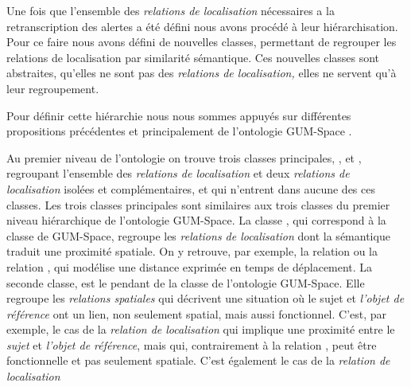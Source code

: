 
Une fois que l'ensemble des \emph{relations de localisation}
nécessaires a la retranscription des alertes a été défini nous avons
procédé à leur hiérarchisation. Pour ce faire nous avons défini de
nouvelles classes, permettant de regrouper les relations de
localisation par similarité sémantique. Ces nouvelles classes sont
abstraites, \ie qu'elles ne sont pas des \emph{relations de
  localisation,} elles ne servent qu'à leur regroupement.

Pour définir cette hiérarchie nous nous sommes appuyés sur différentes
propositions précédentes et principalement de l'ontologie GUM-Space
\autocite{Bateman2010}.

Au premier niveau de l'ontologie on trouve trois classes principales,
,
 et
,
regroupant l'ensemble des \emph{relations de localisation} et deux
\emph{relations de localisation} isolées et complémentaires,
 et 
qui n'entrent dans aucune des ces classes. Les trois classes
principales sont similaires aux trois classes du premier niveau
hiérarchique de l'ontologie GUM-Space. La classe
, qui
correspond à la classe
 de GUM-Space,
regroupe les \emph{relations de localisation} dont la sémantique
traduit une proximité spatiale. On y retrouve, par exemple, la
relation  ou la relation
, qui modélise une distance exprimée
en temps de déplacement. La seconde classe,
 est le
pendant de la classe
 de
l'ontologie GUM-Space. Elle regroupe les \emph{relations spatiales}
qui décrivent une situation où le sujet et \emph{l'objet de référence}
ont un lien, non seulement spatial, mais aussi fonctionnel. C'est, par
exemple, le cas de la \emph{relation de localisation}
 qui implique une proximité entre le
\emph{sujet} et \emph{l'objet de référence}, mais qui, contrairement à
la relation , peut être fonctionnelle et pas
seulement spatiale. C'est également le cas de la \emph{relation de
  localisation}
